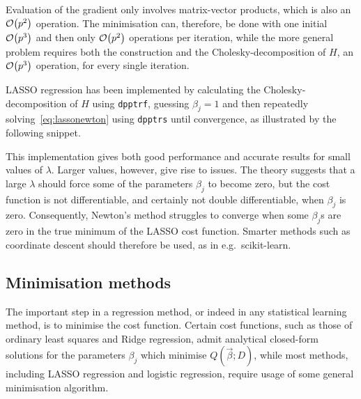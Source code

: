 \documentclass[11pt,british,a4paper]{article}
\numberwithin{equation}{section}
\begin{document}
Evaluation of the gradient only involves matrix-vector products, which is also an \(\mathcal{O}\qty(p^2)\) operation.
The minimisation can, therefore, be done with one initial \(\mathcal{O}\qty(p^3)\) and then only \(\mathcal{O}\qty(p^2)\) operations per iteration, while the more general problem requires both the construction and the Cholesky-decomposition of \(H\), an \(\mathcal{O}\qty(p^3)\) operation, for every single iteration.

LASSO regression has been implemented by calculating the Cholesky-decomposition of \(H\) using \lstinline{dpptrf}, guessing \(\beta_j=1\) and then repeatedly solving~\vref{eq:lassonewton} using \lstinline{dpptrs} until convergence, as illustrated by the following snippet.


This implementation gives both good performance and accurate results for small values of \(\lambda\).
Larger values, however, give rise to issues.
The theory suggests that a large \(\lambda\) should force some of the parameters \(\beta_j\) to become zero, but the cost function is not differentiable, and certainly not double differentiable, when \(\beta_j\) is zero.
Consequently, Newton's method struggles to converge when some \(\beta_j\)s are zero in the true minimum of the LASSO cost function.
Smarter methods such as coordinate descent\cite{friedman} should therefore be used, as in e.g.\ scikit-learn.


\subsection{Minimisation methods}
The important step in a regression method, or indeed in any statistical learning method, is to minimise the cost function.
Certain cost functions, such as those of ordinary least squares and Ridge regression, admit analytical closed-form solutions for the parameters \(\beta_j\) which minimise \(Q(\vec{\beta};D)\), while most methods, including LASSO regression and logistic regression, require usage of some general minimisation algorithm.
\end{document}
